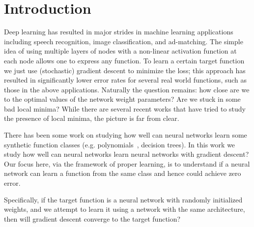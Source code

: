 \section{Introduction}


Deep learning has resulted in major strides in machine learning applications including speech recognition, image classification, and ad-matching. The simple idea of using multiple layers of nodes with a non-linear activation function at each node allows one to express any function.  To learn a certain target function we just use (stochastic) gradient descent to minimize the loss; this approach has resulted in significantly lower error rates for several real world functions, such as those in the above applications. Naturally the question remains: how close are we to the optimal values of the network weight parameters? Are we stuck in some bad local minima? While there are several recent works \cite{ChoromanskaHMAL14, DauphinPGCGB14, Kawaguchi16a} that have tried to study the presence of local minima, the picture is far from clear.

There has been some work on studying how well can neural networks learn some synthetic function classes (e.g. polynomials~\cite{valiant2014learning}, decision trees). 
In this work we study how well can neural networks learn neural networks with gradient descent?
Our focus here, via the framework of proper learning, is to understand if a neural network can learn a function from the same class and hence could achieve zero error. 

%
%

Specifically, if the target function is a neural network with randomly initialized weights, and we attempt to learn it using a network with the same architecture, then will gradient descent converge to the target function?





